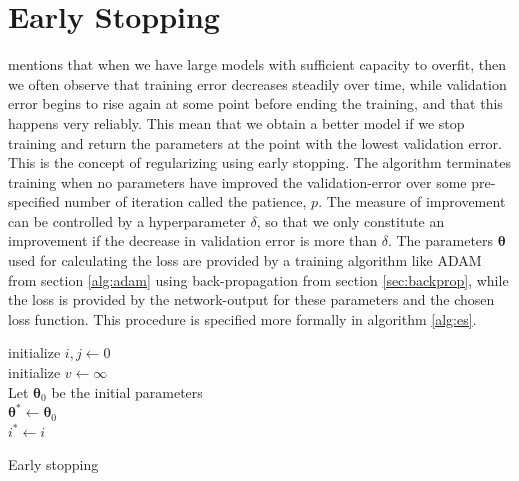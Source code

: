 \section{Early Stopping} \label{sec:early_stopping}
\cite{Goodfellow-et-al-2016} mentions that when we have large models with sufficient capacity to overfit, then we often observe that training error decreases steadily over time, while validation error begins to rise again at some point before ending the training, and that this happens very reliably. This mean that we obtain a better model if we stop training and return the parameters at the point with the lowest validation error. This is the concept of regularizing using early stopping. The algorithm terminates training when no parameters have improved the validation-error over some pre-specified number of iteration called the patience, $p$. The measure of improvement can be controlled by a hyperparameter $\delta$, so that we only constitute an improvement if the decrease in validation error is more than $\delta$. The parameters $\boldsymbol{\theta}$ used for calculating the loss are provided by a training algorithm like ADAM from section \ref{alg:adam} using back-propagation from section \ref{sec:backprop}, while the loss is provided by the network-output for these parameters and the chosen loss function. This procedure is specified more formally in algorithm \ref{alg:es}.

\begin{algorithm}\label{alg:es}
\SetAlgoLined
{}
    initialize $i, j \leftarrow 0$ \\
    initialize $v \leftarrow \infty$\\
    Let $\boldsymbol{\theta}_0$ be the initial parameters\\
    $\boldsymbol{\theta}^* \leftarrow \boldsymbol{\theta}_0$\\
    $i^* \leftarrow i$\\
 \caption{Early stopping}
\end{algorithm}

